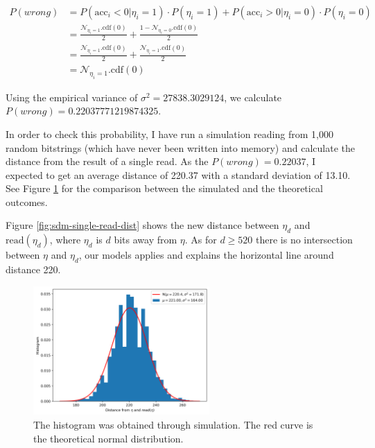 \begin{align}
P(wrong) &= P(\text{acc}_i < 0 | \eta_i = 1) \cdot P(\eta_i = 1) + P(\text{acc}_i > 0 | \eta_i = 0) \cdot P(\eta_i = 0) \\
    &= \frac{\mathcal{N}_{\eta_i=1}.\text{cdf}(0)}{2} + \frac{1-\mathcal{N}_{\eta_i=0}.\text{cdf}(0)}{2} \\
    &= \frac{\mathcal{N}_{\eta_i=1}.\text{cdf}(0)}{2} + \frac{\mathcal{N}_{\eta_i=1}.\text{cdf}(0)}{2} \\
    &= \mathcal{N}_{\eta_i=1}.\text{cdf}(0)
\end{align}

Using the empirical variance of $\sigma^2 = 27838.3029124$, we calculate $P(wrong) = 0.22037771219874325$.

In order to check this probability, I have run a simulation reading from 1,000 random bitstrings (which have never been written into memory) and calculate the distance from the result of a single read. As the $P(wrong) = 0.22037$, I expected to get an average distance of 220.37 with a standard deviation of 13.10. See Figure \ref{fig:sdm-read-random-bs} for the comparison between the simulated and the theoretical outcomes.

Figure \ref{fig:sdm-single-read-dist} shows the new distance between $\eta_d$ and $\text{read}(\eta_d)$, where $\eta_d$ is $d$ bits away from $\eta$. As for $d \ge 520$ there is no intersection between $\eta$ and $\eta_d$, our models applies and explains the horizontal line around distance 220.

\begin{figure}[!htb]
  \centering
  \includegraphics[width=0.6\textwidth]{./images02/autocorrelation/read-random-bs.png}

  \caption{The histogram was obtained through simulation. The red curve is the theoretical normal distribution.}
  \label{fig:sdm-read-random-bs}
\end{figure}

